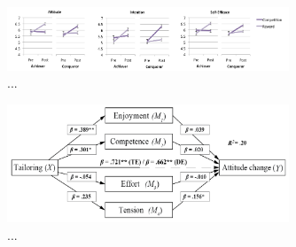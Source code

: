 \documentclass[12pt]{article}
\begin{document}
\begin{figure}[H]
\centering
\includegraphics[width=0.75\textwidth]{img/orji2017-tailoring-results.png} 
\caption{...}\label{fig:orji2017-tailoring-results}
\end{figure}

\begin{figure}[H]
\centering
\includegraphics[width=0.75\textwidth]{img/orji2017-tailoring-mediation-results.png} 
\caption{...}\label{fig:orji2017-tailoring-mediation-results}
\end{figure}


\newpage

\end{document}
